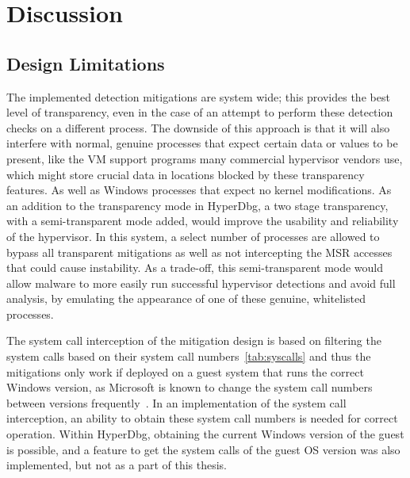 \section{Discussion}\label{s:discussion}


\subsection{Design Limitations}
The implemented detection mitigations are system wide; this provides the best level of transparency, even in the case of an attempt 
to perform these detection checks on a different process. The downside of this approach is that it will also interfere with normal, 
genuine processes that expect certain data or values to be present, like the VM support programs many commercial hypervisor vendors use, 
which might store crucial data in locations blocked by these transparency features. As well as Windows processes that expect no kernel modifications. 
As an addition to the transparency mode in HyperDbg, a two stage transparency, with a semi-transparent mode added, would improve the usability and reliability of the hypervisor. 
In this system, a select number of processes are allowed to bypass all transparent mitigations as well as not intercepting the MSR accesses that could cause instability. 
As a trade-off, this semi-transparent mode would allow malware to more easily run successful hypervisor detections and avoid full analysis, by emulating the appearance of one 
of these genuine, whitelisted processes.

The system call interception of the mitigation design is based on filtering the system calls based on their system call numbers~\ref{tab:syscalls} and thus the mitigations 
only work if deployed on a guest system that runs the correct Windows version, as Microsoft is known to change the system call numbers between versions 
frequently~\cite{j00ruSyscalls}. In an implementation of the system call interception, an ability to obtain these system call numbers is needed for correct operation.
Within HyperDbg, obtaining the current Windows version of the guest is possible, and a feature to get the system calls of the guest OS version was also implemented, but not as a part of this thesis.

